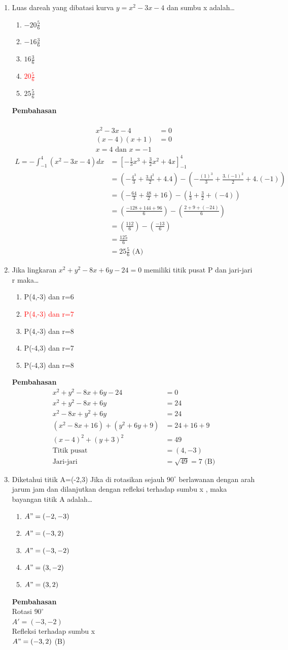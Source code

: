 \documentclass{report}
\newcommand{\options}[5]{
\begin{enumerate}[label=\alph*.]
	\item #1
	\item #2
	\item #3
	\item #4
	\item #5
\end{enumerate}
}
\newcommand{\pemb}{ \textbf{Pembahasan} \\}
\begin{document}
\begin{enumerate}
\item Luas dareah yang dibatasi kurva $y=x^2-3x-4$ dan sumbu x adalah\ldots
\options
{$-20\frac{5}{6}$}
{$-16\frac{3}{6}$}
{$16\frac{3}{6}$}
{\textcolor{red}{$20\frac{5}{6}$}}
{$25\frac{5}{6}$}
\pemb
{}\\
\begin{align*}
	  x^2-3x-4 &= 0 \\
	  (x-4)(x+1) &= 0 \\
	  x = 4 \text{ dan } x = -1
\end{align*}
\begin{align*}
L = -\int_{-1}^4\left(x^2-3x-4\right)dx 
	&= \left[-\frac{1}{3}x^3+\frac{3}{2}x^2+4x\right]_{-1}^4  \\
	&= \left(-\frac{4^3}{3}+\frac{3.4^2}{2}+4.4\right) - \left(-\frac{(1)^3}{3}+\frac{3.(-1)^2}{2}+4.(-1)\right) \\
	&= \left(-\frac{64}{3}+\frac{48}{2}+16\right) - \left(\frac{1}{3}+\frac{3}{2}+(-4)\right) \\
	&= \left(\frac{-128+144+96}{6}\right) - \left(\frac{2+9+(-24)}{6}\right) \\
	&= \left(\frac{112}{6}\right) - \left(\frac{-13}{6}\right) \\
	&= \frac{125}{6} \\
	&= 25\frac{5}{6} \text{ (A)}
\end{align*}

\item Jika lingkaran $x^2+y^2-8x+6y-24=0$ memiliki titik pusat P dan jari-jari r maka\ldots
\options
{P(4,-3) dan r=6}
{\textcolor{red}{P(4,-3) dan r=7}}
{P(4,-3) dan r=8}
{P(-4,3) dan r=7}
{P(-4,3) dan r=8}
\pemb
\begin{align*}
	x^2+y^2-8x+6y-24 &= 0 \\
	x^2+y^2-8x+6y &= 24 \\
	x^2-8x+y^2+6y &= 24 \\
	(x^2-8x+16)+(y^2+6y+9) &= 24+16+9\\
	(x-4)^2+(y+3)^2 &= 49 \\
	\text{Titik pusat} &= (4, -3) \\
	\text{Jari-jari} &= \sqrt{49} = 7 \text{ (B)}
\end{align*}

\item Diketahui titik A=(-2,3) Jika di rotasikan sejauh $90^{\circ}$ berlawanan dengan arah jarum jam dan dilanjutkan dengan refleksi terhadap sumbu x , maka bayangan titik A adalah\ldots
\options
{$A"=(-2,-3)$}
{\textcolor{red}{$A"=(-3,2)$}}
{$A"=(-3,-2)$}
{$A"=(3,-2)$}
{$A"=(3,2)$}
\pemb
Rotasi $90^{\circ}$ \\
$A'=(-3,-2)$ \\
Refleksi terhadap sumbu x \\
$A"=(-3,2)$ (B) \\


\end{enumerate}
\end{document}
